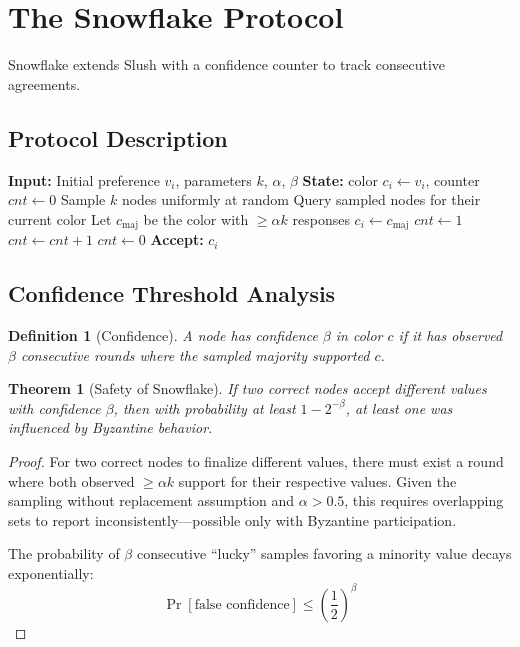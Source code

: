 \documentclass[11pt,a4paper]{article}
\newtheorem{theorem}{Theorem}
\newtheorem{definition}{Definition}
\begin{document}
\section{The Snowflake Protocol}

Snowflake extends Slush with a confidence counter to track consecutive agreements.

\subsection{Protocol Description}

\begin{algorithm}
\caption{Snowflake Protocol for Node $i$}
\begin{algorithmic}[1]
\STATE \textbf{Input:} Initial preference $v_i$, parameters $k$, $\alpha$, $\beta$
\STATE \textbf{State:} color $c_i \gets v_i$, counter $cnt \gets 0$
    \STATE Sample $k$ nodes uniformly at random
    \STATE Query sampled nodes for their current color
    \STATE Let $c_{\text{maj}}$ be the color with $\geq \alpha k$ responses
            \STATE $c_i \gets c_{\text{maj}}$
            \STATE $cnt \gets 1$
        \ELSE
            \STATE $cnt \gets cnt + 1$
        \ENDIF
    \ELSE
        \STATE $cnt \gets 0$
    \ENDIF
\ENDWHILE
\STATE \textbf{Accept:} $c_i$
\end{algorithmic}
\end{algorithm}

\subsection{Confidence Threshold Analysis}

\begin{definition}[Confidence]
A node has confidence $\beta$ in color $c$ if it has observed $\beta$ consecutive rounds where the sampled majority supported $c$.
\end{definition}

\begin{theorem}[Safety of Snowflake]
\label{thm:snowflake-safety}
If two correct nodes accept different values with confidence $\beta$, then with probability at least $1 - 2^{-\beta}$, at least one was influenced by Byzantine behavior.
\end{theorem}

\begin{proof}
For two correct nodes to finalize different values, there must exist a round where both observed $\geq \alpha k$ support for their respective values. Given the sampling without replacement assumption and $\alpha > 0.5$, this requires overlapping sets to report inconsistently---possible only with Byzantine participation.

The probability of $\beta$ consecutive ``lucky'' samples favoring a minority value decays exponentially:
\begin{equation}
\Pr[\text{false confidence}] \leq \left(\frac{1}{2}\right)^\beta
\end{equation}
\end{proof}
\end{document}
